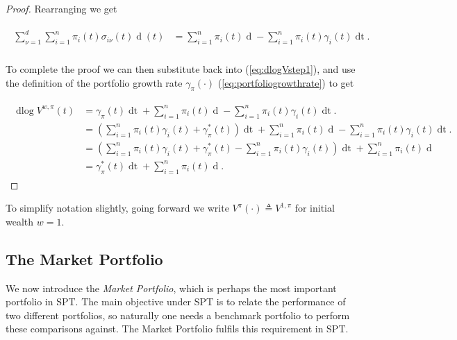 \documentclass[british]{amsart} \usepackage{lmodern}
\numberwithin{equation}{section} \numberwithin{figure}{section}
\theoremstyle{plain} \newtheorem{thm}{\protect\theoremname}[section]
\theoremstyle{definition} \newtheorem{defn}[thm]{\protect\definitionname}
\theoremstyle{plain} \newtheorem{assumption}[thm]{\protect\assumptionname}
\theoremstyle{plain} \newtheorem{lem}[thm]{\protect\lemmaname}
\theoremstyle{plain} \newtheorem{prop}[thm]{\protect\propositionname}
\theoremstyle{remark} \newtheorem{rem}[thm]{\protect\remarkname}
\theoremstyle{plain} \newtheorem{cor}[thm]{\protect\corollaryname}
\renewcommand{\d}[1]{\mathop{\mathrm{d}{#1}}}
\newcommand{\defeq}{\mathop{\triangleq}} \newcommand{\almostsurely}{\text{a.s.}}
\newcommand{\V}{V^{w,\pi}}
\begin{document}
\begin{proof}
  Rearranging we get 

  \begin{gather*}
    \begin{split}
       \sum_{\nu=1}^{d} \sum_{i=1}^{n} 
            \pi_{i}(t) \sigma_{i\nu}(t) \d{W_{\nu}}(t) &=
       \sum_{i=1}^{n} \pi_{i}(t) \d{\log{X_{i}(t)}} -
       \sum_{i=1}^{n} \pi_{i}(t) \gamma_{i}(t) \d{t}. \\
    \end{split}
  \end{gather*}

  To complete the proof we can then substitute back into (\ref{eq:dlogVstep1}),
  and use the  definition of the portfolio growth rate $\gamma_{\pi}(\cdot)$
  (\ref{eq:portfoliogrowthrate}) to get 

  \begin{gather}
    \begin{split}
      \d\log{\V(t)} 
      &=
        \gamma_{\pi}(t) \d{t} +
        \sum_{i=1}^{n} \pi_{i}(t) \d{\log{X_{i}(t)}} -
        \sum_{i=1}^{n} \pi_{i}(t) \gamma_{i}(t) \d{t}. \\
      &=
        \left( 
            \sum_{i=1}^{n} \pi_{i}(t)\gamma_{i}(t) + \gamma_{\pi}^{*}(t) 
        \right) \d{t} +
        \sum_{i=1}^{n} \pi_{i}(t) \d{\log{X_{i}(t)}} -
        \sum_{i=1}^{n} \pi_{i}(t) \gamma_{i}(t) \d{t}. \\
       &=
        \left( 
            \sum_{i=1}^{n} \pi_{i}(t)\gamma_{i}(t) 
            + \gamma_{\pi}^{*}(t) 
            - \sum_{i=1}^{n} \pi_{i}(t) \gamma_{i}(t)
        \right) \d{t} +
        \sum_{i=1}^{n} \pi_{i}(t) \d{\log{X_{i}(t)}} \\
       &=
        \gamma_{\pi}^{*}(t)\d{t} +
        \sum_{i=1}^{n} \pi_{i}(t) \d{\log{X_{i}(t)}}.
    \end{split}
  \end{gather}

\end{proof}

To simplify notation slightly, going forward we write $V^{\pi}(\cdot) \defeq V^{1,\pi}$ for initial wealth $w=1$.

\newpage
\subsection{The Market Portfolio}

We now introduce the \textit{Market Portfolio}, which is perhaps the most
important portfolio in SPT. The main objective under SPT is to relate the 
performance of two different portfolios, so naturally one needs a 
benchmark portfolio to perform these comparisons against. The Market Portfolio
fulfils this requirement in SPT.
\end{document}
